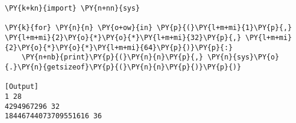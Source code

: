 \begin{Verbatim}[label=\makebox{\href{https://github.com/unipi-physics-labs/statnotes/tree/main/snippy/integer_size.py}{https://github.com/.../integer\_size.py}},commandchars=\\\{\}]
\PY{k+kn}{import} \PY{n+nn}{sys}

\PY{k}{for} \PY{n}{n} \PY{o+ow}{in} \PY{p}{(}\PY{l+m+mi}{1}\PY{p}{,} \PY{l+m+mi}{2}\PY{o}{*}\PY{o}{*}\PY{l+m+mi}{32}\PY{p}{,} \PY{l+m+mi}{2}\PY{o}{*}\PY{o}{*}\PY{l+m+mi}{64}\PY{p}{)}\PY{p}{:}
    \PY{n+nb}{print}\PY{p}{(}\PY{n}{n}\PY{p}{,} \PY{n}{sys}\PY{o}{.}\PY{n}{getsizeof}\PY{p}{(}\PY{n}{n}\PY{p}{)}\PY{p}{)}

[Output]
1 28
4294967296 32
18446744073709551616 36
\end{Verbatim}
